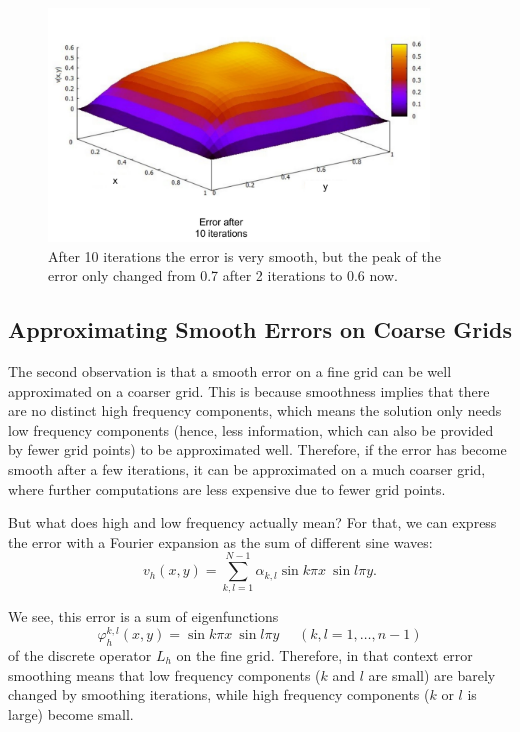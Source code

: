 \begin{figure}[tbp]
	\centering
	\includegraphics[width=0.9\textwidth]{chapters/chapter02/mg_error_smoothing_10}
	\caption{After 10 iterations the error is very smooth, but the peak of the error only changed from 0.7 after 2 iterations to 0.6 now.}
	\label{fig:mg_error_smoothing_10}
\end{figure}


\subsection{Approximating Smooth Errors on Coarse Grids}
The second observation is that a smooth error on a fine grid can be well approximated on a coarser grid. This is because smoothness implies that there are no distinct high frequency components, which means the solution only needs low frequency components (hence, less information, which can also be provided by fewer grid points) to be approximated well. Therefore, if the error has become smooth after a few iterations, it can be approximated on a much coarser grid, where further computations are less expensive due to fewer grid points.

But what does high and low frequency actually mean? For that, we can express the error with a Fourier expansion as the sum of different sine waves:
\begin{equation}
v_h(x,y) = \sum_{k,l = 1}^{N-1} \alpha_{k,l} \sin k \pi x~ \sin l \pi y.
\end{equation}

We see, this error is a sum of eigenfunctions 
\begin{equation}
\varphi_h ^{k,l}(x,y) = \sin k \pi x~ \sin l \pi y \text{~~~~}(k,l = 1, \hdots, n-1)
\end{equation}
of the discrete operator $L_h$ on the fine grid. Therefore, in that context error smoothing means that low frequency components ($k$ and $l$ are small) are barely changed by smoothing iterations, while high frequency components ($k$ or $l$ is large) become small.

